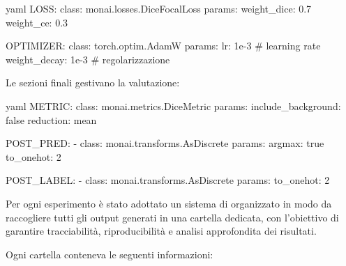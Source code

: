 \begin{code}{yaml}
LOSS:
  class: monai.losses.DiceFocalLoss
  params:
    weight_dice: 0.7
    weight_ce: 0.3

OPTIMIZER:
  class: torch.optim.AdamW
  params:
    lr: 1e-3               # learning rate
    weight_decay: 1e-3      # regolarizzazione
\end{code}


Le sezioni finali gestivano la valutazione:

\begin{code}{yaml}
METRIC:
  class: monai.metrics.DiceMetric
  params:
    include_background: false
    reduction: mean

POST_PRED:                                                                              
  - class: monai.transforms.AsDiscrete
    params:
      argmax: true
      to_onehot: 2

POST_LABEL:                                                                                 
  - class: monai.transforms.AsDiscrete
    params:
      to_onehot: 2
\end{code}




Per ogni esperimento è stato adottato un sistema di  organizzato in modo da raccogliere tutti gli output generati in una cartella dedicata, con l’obiettivo di garantire tracciabilità, riproducibilità e analisi approfondita dei risultati.

Ogni cartella conteneva le seguenti informazioni:


